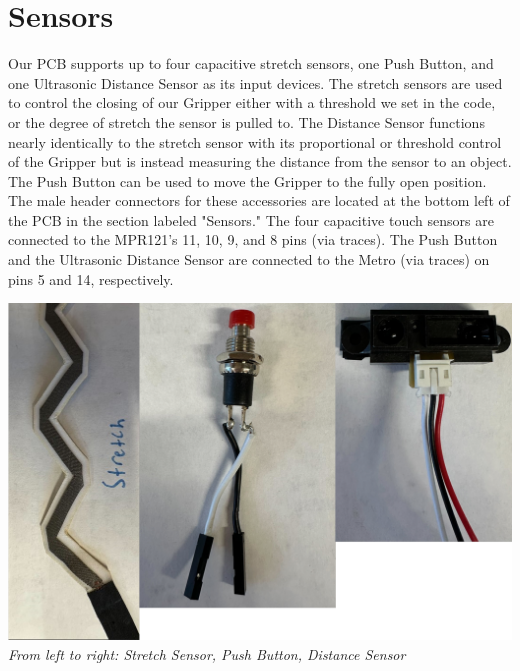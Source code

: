 \documentclass{article}
\begin{document}
\section{Sensors}
Our PCB supports up to four capacitive stretch sensors, one Push Button, and one Ultrasonic Distance Sensor as its input devices. The stretch sensors are used to control the closing of our Gripper either with a threshold we set in the code, or the degree of stretch the sensor is pulled to. The Distance Sensor functions nearly identically to the stretch sensor with its proportional or threshold control of the Gripper but is instead measuring the distance from the sensor to an object. The Push Button can be used to move the Gripper to the fully open position.\\

The male header connectors for these accessories are located at the bottom left of the PCB in the section labeled "Sensors." The four capacitive touch sensors are connected to the MPR121's 11, 10, 9, and 8 pins (via traces). The Push Button and the Ultrasonic Distance Sensor are connected to the Metro (via traces) on pins 5 and 14, respectively.\\
\begin{center}
    \includegraphics[scale=1]{Images/AllSensors.png}
    \\[1ex] %
    \textit{From left to right: Stretch Sensor, Push Button, Distance Sensor}
\end{center}
\end{document}
